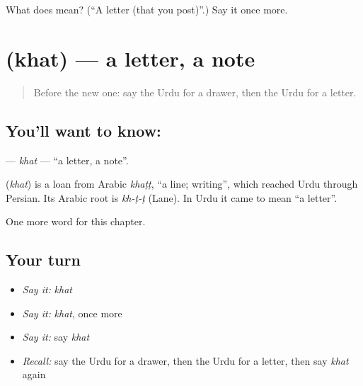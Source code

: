 \begin{tcolorbox}[breakable,colback=teal!4,colframe=teal!35!black,title={Before you move on}]
What does  mean? (\textquotedblleft{}A letter (that you post)\textquotedblright{}.) Say it once more.
\end{tcolorbox}
\section[\texorpdfstring{\ur{خط} (khat)}{خط (khat)}]{ (khat) — a letter, a note}

\label{lesson:UR-C113-khat}



\begin{quote}
Before the new one: say the Urdu for a drawer, then the Urdu for a letter.
\end{quote}

\subsection*{You'll want to know: }
\textbf{} — \emph{khat} — \textquotedblleft{}a letter, a note\textquotedblright{}.

\begin{cousinweb}
\textbf{} (\emph{khat}) is a loan from Arabic \emph{khaṭṭ}, \textquotedblleft{}a line; writing\textquotedblright{}, which reached Urdu through Persian. Its Arabic root is \emph{kh-ṭ-ṭ} (Lane). In Urdu it came to mean \textquotedblleft{}a letter\textquotedblright{}.
\end{cousinweb}

\begin{grammarlens}[title={What you've built}]
One more word for this chapter.
\end{grammarlens}

\subsection*{Your turn}
\begin{itemize}
\raggedright
  \item \emph{Say it:} \emph{khat}
  \item \emph{Say it:} \emph{khat}, once more
  \item \emph{Say it:} say \emph{khat}
  \item \emph{Recall:} say the Urdu for a drawer, then the Urdu for a letter, then say \emph{khat} again
\end{itemize}

